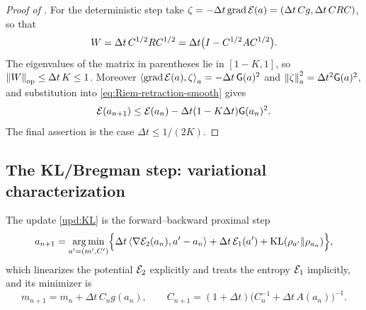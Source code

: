 \begin{proof}[Proof of ]
    For the deterministic step take $\zeta=-\Delta t\operatorname{grad}\mathcal{E}(a)=(\Delta t\,Cg,\Delta t\,CRC)$,
    so that
    \begin{equation*}
        W=\Delta t\,C^{1/2}RC^{1/2}=\Delta t\bigl(I-C^{1/2}AC^{1/2}\bigr).
    \end{equation*}
    The eigenvalues of the matrix in parentheses lie in $[1-K,1]$, so
    $\left\lVert W\right\rVert_{\mathrm{op}}\leq\Delta t\,K\leq1$. Moreover
    $\left\langle \operatorname{grad}\mathcal{E}(a),\zeta\right\rangle_a=-\Delta t\,\mathsf{G}(a)^2$ and
    $\left\lVert \zeta\right\rVert_a^2=\Delta t^2\mathsf{G}(a)^2$, and substitution into
    \eqref{eq:Riem-retraction-smooth} gives
    \begin{equation*}
        \mathcal{E}(a_{n+1})\leq\mathcal{E}(a_n)-\Delta t(1-K\Delta t)\mathsf{G}(a_n)^2 .
    \end{equation*}
    The final assertion is the case $\Delta t\leq1/(2K)$.
\end{proof}

\subsection{The KL/Bregman step: variational characterization}

\begin{lemma}\label{lem:KL-argmin}
    The update \eqref{upd:KL} is the forward--backward proximal step
    \begin{equation}\label{eq:KL-argmin}
        a_{n+1}
        =\operatorname*{arg\,min}_{a'=(m',C')}
        \Bigl\{
            \Delta t\left\langle \nabla\mathcal{E}_2(a_n),a'-a_n\right\rangle
            +\Delta t\,\mathcal{E}_1(a')
            +\mathrm{KL}(\rho_{a'}\|\rho_{a_n})
        \Bigr\},
    \end{equation}
    which linearizes the potential $\mathcal{E}_2$ explicitly and treats the entropy $\mathcal{E}_1$
    implicitly, and its minimizer is
    \begin{equation*}
        m_{n+1}=m_n+\Delta t\,C_ng(a_n),
        \qquad
        C_{n+1}=(1+\Delta t)\bigl(C_n^{-1}+\Delta t\,A(a_n)\bigr)^{-1}.
    \end{equation*}
\end{lemma}

